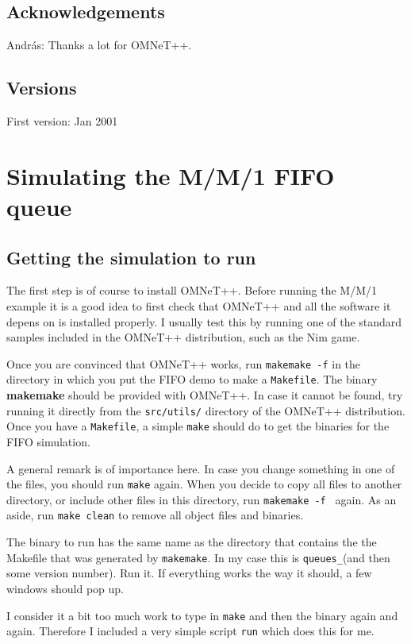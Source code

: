 \documentclass[a4paper]{article}
\begin{document}
\subsection{Acknowledgements}
\label{sec:acknowledgements}
Andr{\'a}s: Thanks a lot for OMNeT++.


\subsection{Versions}
\noindent First version: Jan 2001

\section{Simulating the M/M/1 FIFO queue}
\label{sec:simulating-mm1-fifo}

\subsection{Getting the simulation to run}
\label{sec:getting-it-running}
The first step is of course to install OMNeT++. Before running the
M/M/1 example it is a good idea to first check that OMNeT++ and all
the software it depens on is installed properly. I usually test this
by running one of the standard samples included in the OMNeT++
distribution, such as the Nim game. 

Once you are convinced that OMNeT++ works, run \texttt{makemake -f} in
the directory in which you put the FIFO demo to make a
\texttt{Makefile}. The binary \textbf{makemake} should be provided with OMNeT++.
In case it cannot be found, try running it directly from the
\texttt{src/utils/} directory of the OMNeT++ distribution. Once you
have a \texttt{Makefile}, a simple \texttt{make} should do to get the
binaries for the FIFO simulation.  

A general remark is of importance here. In case you change something in one
of the files, you should run \texttt{make} again. When you decide to
copy all files to another directory, or include other files in this
directory, run \texttt{makemake -f } again. As an aside, run
\texttt{make clean} to remove all object files and binaries.

The binary to run has the same name as the directory that contains the
the Makefile that was generated by \texttt{makemake}. In my case this
is \texttt{queues\_}(and then some version number). Run it. If
everything works the way it should, a few windows should pop up.

I consider it a bit too much work to type in \texttt{make} and then
the binary  again and again. Therefore I included a very
simple script \texttt{run} which does this for me.
\end{document}
